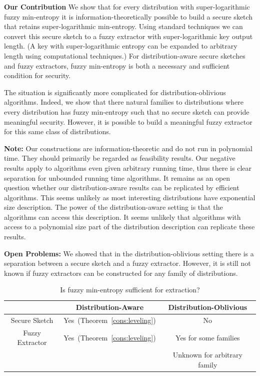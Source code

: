\documentclass[11pt]{article}
\newcommand{\thref}[1]{\mbox{Theorem~\ref{#1}}}
\newcommand{\Hfuzz}{\mathrm{H}^{\mathtt{fuzz}}_{t,\infty}}
\begin{document}
\textbf{Our Contribution} We show that for every distribution with super-logarithmic fuzzy min-entropy it is information-theoretically possible to build a secure sketch that retains super-logarithmic min-entropy.  Using standard techniques we can convert this secure sketch to a fuzzy extractor with super-logarithmic key output length.  (A key with super-logarithmic entropy can be expanded to arbitrary length using computational techniques.)  For distribution-aware secure sketches and fuzzy extractors, fuzzy min-entropy is both a necessary and sufficient condition for security.  

The situation is significantly more complicated for distribution-oblivious algorithms.  Indeed, we show that there natural families to distributions where every distribution has fuzzy min-entropy such that no secure sketch can provide meaningful security.  However, it is possible to build a meaningful fuzzy extractor for this same class of distributions.

\textbf{Note:} Our constructions are information-theoretic and do not run in polynomial time.  They should primarily be regarded as feasibility results.  Our negative results apply to algorithms even given arbitrary running time, thus there is clear separation for unbounded running time algorithms.  It remains as an open question whether our distribution-aware results can be replicated by efficient algorithms.  This seems unlikely as most  interesting distributions have exponential size description.  The power of the distribution-aware setting is that the algorithms can access this description.  It seems unlikely that algorithms with access to a polynomial size part of the distribution description can replicate these results.

\textbf{Open Problems:} We showed that in the distribution-oblivious setting there is a separation between a secure sketch and a fuzzy extractor.  However, it is still not known if fuzzy extractors can be constructed for any family of distributions.

\begin{table}
\begin{center}
\begin{tabular}{c | c | c }
& Distribution-Aware & Distribution-Oblivious\\
\hline
Secure Sketch & Yes~(\thref{cons:leveling}) & No\\
\hline
Fuzzy Extractor & Yes~(\thref{cons:leveling}) & Yes for some families\\
& & Unknown for arbitrary family
\end{tabular}
\end{center}
\caption{Is fuzzy min-entropy sufficient for extraction?}
\label{tab:main results}
\end{table}
\end{document}
